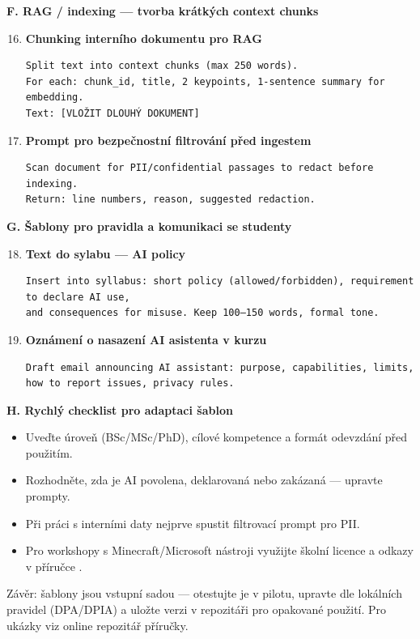 \medskip

\textbf{F. RAG / indexing — tvorba krátkých context chunks}

\begin{enumerate}
  \setcounter{enumi}{15}
  \item \textbf{Chunking interního dokumentu pro RAG}
  \begin{verbatim}
Split text into context chunks (max 250 words).
For each: chunk_id, title, 2 keypoints, 1-sentence summary for embedding.
Text: [VLOŽIT DLOUHÝ DOKUMENT]
  \end{verbatim}
  \item \textbf{Prompt pro bezpečnostní filtrování před ingestem}
  \begin{verbatim}
Scan document for PII/confidential passages to redact before indexing.
Return: line numbers, reason, suggested redaction.
  \end{verbatim}
\end{enumerate}

\medskip

\textbf{G. Šablony pro pravidla a komunikaci se studenty}

\begin{enumerate}
  \setcounter{enumi}{17}
  \item \textbf{Text do sylabu — AI policy}
  \begin{verbatim}
Insert into syllabus: short policy (allowed/forbidden), requirement to declare AI use,
and consequences for misuse. Keep 100–150 words, formal tone.
  \end{verbatim}
  \item \textbf{Oznámení o nasazení AI asistenta v kurzu}
  \begin{verbatim}
Draft email announcing AI assistant: purpose, capabilities, limits, how to report issues, privacy rules.
  \end{verbatim}
\end{enumerate}

\medskip

\textbf{H. Rychlý checklist pro adaptaci šablon}

\begin{itemize}
  \item Uveďte úroveň (BSc/MSc/PhD), cílové kompetence a formát odevzdání před použitím.
  \item Rozhodněte, zda je AI povolena, deklarovaná nebo zakázaná — upravte prompty.
  \item Při práci s interními daty nejprve spustit filtrovací prompt pro PII.
  \item Pro workshopy s Minecraft/Microsoft nástroji využijte školní licence a odkazy v příručce \cite{kb_ai_101_tipu_pdf_04e4a115_page_15_2,kb_ai_101_tipu_pdf_04e4a115_page_8_1}.
\end{itemize}

\medskip

Závěr: šablony jsou vstupní sadou — otestujte je v pilotu, upravte dle lokálních pravidel (DPA/DPIA) a uložte verzi v repozitáři pro opakované použití. Pro ukázky viz online repozitář příručky.